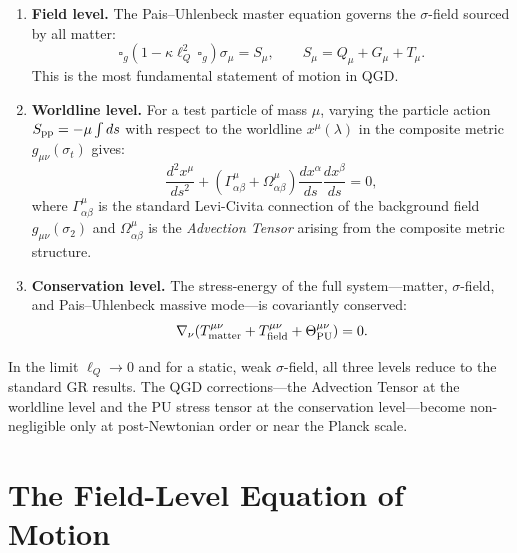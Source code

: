 \documentclass[11pt,a4paper]{article}
\theoremstyle{plain}
\theoremstyle{definition}
\theoremstyle{remark}
\newcommand{\lQ}{\ell_Q}
\newcommand{\boxg}{\square_g}
\begin{document}
\begin{enumerate}
\item \textbf{Field level.}  The Pais--Uhlenbeck master equation governs the
  $\sigma$-field sourced by all matter:
  \begin{equation}
    \boxg\!\left(1 - \kappa\lQ^2\,\boxg\right)\sigma_\mu = S_\mu,
    \qquad S_\mu = Q_\mu + G_\mu + T_\mu.
    \label{eq:PU_field}
  \end{equation}
  This is the most fundamental statement of motion in QGD.

\item \textbf{Worldline level.}  For a test particle of mass $\mu$, varying the
  particle action $S_{\rm pp} = -\mu\int ds$ with respect to the worldline
  $x^\mu(\lambda)$ in the composite metric $g_{\mu\nu}(\sigma_t)$ gives:
  \begin{equation}
    \frac{d^2 x^\mu}{ds^2}
    + \left(\Gamma^\mu_{\alpha\beta} + \Omega^\mu_{\alpha\beta}\right)
      \frac{dx^\alpha}{ds}\frac{dx^\beta}{ds} = 0,
    \label{eq:modified_geodesic}
  \end{equation}
  where $\Gamma^\mu_{\alpha\beta}$ is the standard Levi-Civita connection of the
  background field $g_{\mu\nu}(\sigma_2)$ and $\Omega^\mu_{\alpha\beta}$ is the
  \emph{Advection Tensor} arising from the composite metric structure.

\item \textbf{Conservation level.}  The stress-energy of the full system---matter,
  $\sigma$-field, and Pais--Uhlenbeck massive mode---is covariantly conserved:
  \begin{equation}
    \nabla_\nu\!\left(
      T^{\mu\nu}_{\rm matter}
      + T^{\mu\nu}_{\rm field}
      + \Theta^{\mu\nu}_{\rm PU}
    \right) = 0.
    \label{eq:full_conservation}
  \end{equation}
\end{enumerate}

In the limit $\lQ \to 0$ and for a static, weak $\sigma$-field, all three levels
reduce to the standard GR results.  The QGD corrections---the Advection Tensor at
the worldline level and the PU stress tensor at the conservation level---become
non-negligible only at post-Newtonian order or near the Planck scale.

\section{The Field-Level Equation of Motion}
\label{sec:field_eom}
\end{document}

